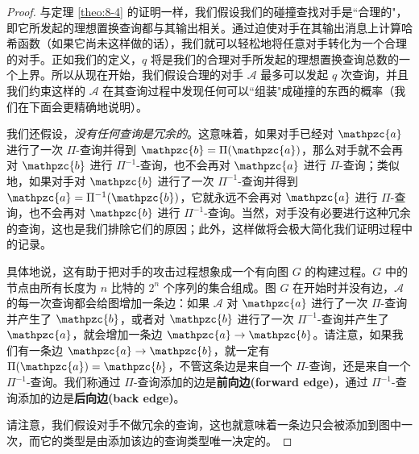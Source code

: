 \begin{proof}
与定理 \ref{theo:8-4} 的证明一样，我们假设我们的碰撞查找对手是``合理的"，即它所发起的理想置换查询都与其输出相关。通过迫使对手在其输出消息上计算哈希函数（如果它尚未这样做的话），我们就可以轻松地将任意对手转化为一个合理的对手。正如我们的定义，$q$ 将是我们的合理对手所发起的理想置换查询总数的一个上界。所以从现在开始，我们假设合理的对手 $\mathcal{A}$ 最多可以发起 $q$ 次查询，并且我们约束这样的 $\mathcal{A}$ 在其查询过程中发现任何可以``组装"成碰撞的东西的概率（我们在下面会更精确地说明）。

我们还假设，\emph{没有任何查询是冗余的}。这意味着，如果对手已经对 $\mathpzc{a}$ 进行了一次 $\Pi$-查询并得到 $\mathpzc{b}=\Pi(\mathpzc{a})$，那么对手就不会再对 $\mathpzc{b}$ 进行 $\Pi^{-1}$-查询，也不会再对 $\mathpzc{a}$ 进行 $\Pi$-查询；类似地，如果对手对 $\mathpzc{b}$ 进行了一次 $\Pi^{-1}$-查询并得到 $\mathpzc{a}=\Pi^{-1}(\mathpzc{b})$，它就永远不会再对 $\mathpzc{a}$ 进行 $\Pi$-查询，也不会再对 $\mathpzc{b}$ 进行 $\Pi^{-1}$-查询。当然，对手没有必要进行这种冗余的查询，这也是我们排除它们的原因；此外，这样做将会极大简化我们证明过程中的记录。

具体地说，这有助于把对手的攻击过程想象成一个有向图 $G$ 的构建过程。$G$ 中的节点由所有长度为 $n$ 比特的 $2^n$ 个序列的集合组成。图 $G$ 在开始时并没有边，$\mathcal{A}$ 的每一次查询都会给图增加一条边：如果 $\mathcal{A}$ 对 $\mathpzc{a}$ 进行了一次 $\Pi$-查询并产生了 $\mathpzc{b}$，或者对 $\mathpzc{b}$ 进行了一次 $\Pi^{-1}$-查询并产生了 $\mathpzc{a}$，就会增加一条边 $\mathpzc{a}\to\mathpzc{b}$。请注意，如果我们有一条边 $\mathpzc{a}\to\mathpzc{b}$，就一定有 $\Pi(\mathpzc{a})=\mathpzc{b}$，不管这条边是来自一个 $\Pi$-查询，还是来自一个 $\Pi^{-1}$-查询。我们称通过 $\Pi$-查询添加的边是\textbf{前向边(forward edge)}，通过 $\Pi^{-1}$-查询添加的边是\textbf{后向边(back edge)}。

请注意，我们假设对手不做冗余的查询，这也就意味着一条边只会被添加到图中一次，而它的类型是由添加该边的查询类型唯一决定的。


\end{proof}
